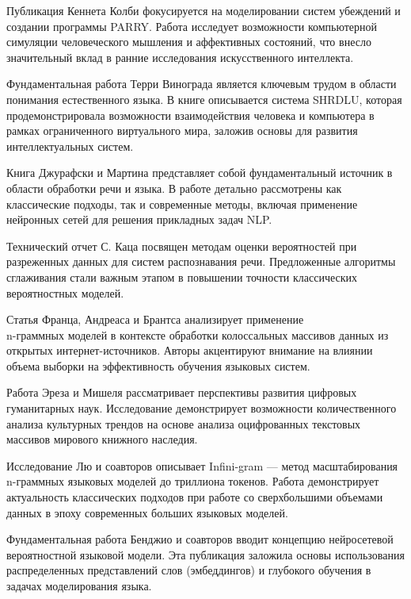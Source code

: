 \documentclass[coursework]{SCWorks}
\begin{document}
    Публикация Кеннета Колби \cite{colby1972} фокусируется на моделировании систем убеждений и создании программы PARRY. Работа исследует возможности компьютерной симуляции человеческого мышления и аффективных состояний, что внесло значительный вклад в ранние исследования искусственного интеллекта.

    Фундаментальная работа Терри Винограда \cite{winograd1972} является ключевым трудом в области понимания естественного языка. В книге описывается система SHRDLU, которая продемонстрировала возможности взаимодействия человека и компьютера в рамках ограниченного виртуального мира, заложив основы для развития интеллектуальных систем.

    Книга Джурафски и Мартина \cite{jurafsky2000} представляет собой фундаментальный источник в области обработки речи и языка. В работе детально рассмотрены как классические подходы, так и современные методы, включая применение нейронных сетей для решения прикладных задач NLP.

    Технический отчет С. Каца \cite{katz1987estimation} посвящен методам оценки вероятностей при разреженных данных для систем распознавания речи. Предложенные алгоритмы сглаживания стали важным этапом в повышении точности классических вероятностных моделей.

    Статья Франца, Андреаса и Брантса \cite{franz2006n} анализирует применение \\ {n-граммных} моделей в контексте обработки колоссальных массивов данных из открытых интернет-источников. Авторы акцентируют внимание на влиянии объема выборки на эффективность обучения языковых систем.

    Работа Эреза и Мишеля \cite{aiden2011digital} рассматривает перспективы развития цифровых гуманитарных наук. Исследование демонстрирует возможности количественного анализа культурных трендов на основе анализа оцифрованных текстовых массивов мирового книжного наследия.

    Исследование Лю и соавторов \cite{liu2024infini} описывает Infini-gram — метод масштабирования n-граммных языковых моделей до триллиона токенов. Работа демонстрирует актуальность классических подходов при работе со сверхбольшими объемами данных в эпоху современных больших языковых моделей.

    Фундаментальная работа Бенджио и соавторов \cite{Bengio2003NeuralProbLM} вводит концепцию нейросетевой вероятностной языковой модели. Эта публикация заложила основы использования распределенных представлений слов (эмбеддингов) и глубокого обучения в задачах моделирования языка.
\end{document}
